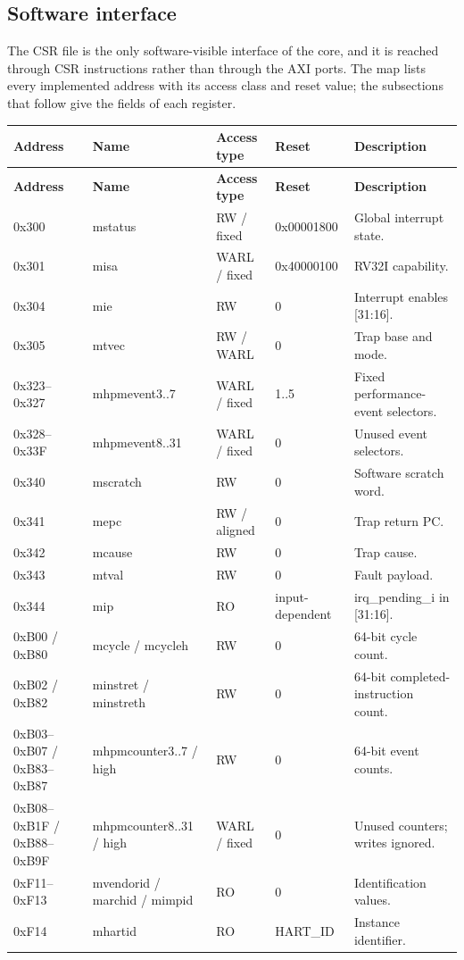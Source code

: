 \documentclass[11pt]{article}
\begin{document}
\subsection{Software interface}
\noindent The CSR file is the only software-visible interface of the core, and it is reached through CSR instructions rather than through the AXI ports. The map lists every implemented address with its access class and reset value; the subsections that follow give the fields of each register.\par\medskip
{\small
\begin{longtable}{@{}L{0.1900\dimexpr\linewidth-48pt\relax}L{0.2300\dimexpr\linewidth-48pt\relax}L{0.1400\dimexpr\linewidth-48pt\relax}L{0.1500\dimexpr\linewidth-48pt\relax}L{0.2900\dimexpr\linewidth-48pt\relax}@{}}
\toprule
\textbf{Address} & \textbf{Name} & \textbf{Access type} & \textbf{Reset} & \textbf{Description} \\ \midrule
\endfirsthead
\toprule
\textbf{Address} & \textbf{Name} & \textbf{Access type} & \textbf{Reset} & \textbf{Description} \\ \midrule
\endhead
0x300 & mstatus & RW / fixed & 0x00001800 & Global interrupt state. \\ \addlinespace[3pt]
0x301 & misa & WARL / fixed & 0x40000100 & RV32I capability. \\ \addlinespace[3pt]
0x304 & mie & RW & 0 & Interrupt enables [31:16]. \\ \addlinespace[3pt]
0x305 & mtvec & RW / WARL & 0 & Trap base and mode. \\ \addlinespace[3pt]
0x323–0x327 & mhpmevent3..7 & WARL / fixed & 1..5 & Fixed performance-event selectors. \\ \addlinespace[3pt]
0x328–0x33F & mhpmevent8..31 & WARL / fixed & 0 & Unused event selectors. \\ \addlinespace[3pt]
0x340 & mscratch & RW & 0 & Software scratch word. \\ \addlinespace[3pt]
0x341 & mepc & RW / aligned & 0 & Trap return PC. \\ \addlinespace[3pt]
0x342 & mcause & RW & 0 & Trap cause. \\ \addlinespace[3pt]
0x343 & mtval & RW & 0 & Fault payload. \\ \addlinespace[3pt]
0x344 & mip & RO & input-dependent & irq\_pending\_i in [31:16]. \\ \addlinespace[3pt]
0xB00 / 0xB80 & mcycle / mcycleh & RW & 0 & 64-bit cycle count. \\ \addlinespace[3pt]
0xB02 / 0xB82 & minstret / minstreth & RW & 0 & 64-bit completed-instruction count. \\ \addlinespace[3pt]
0xB03–0xB07 / 0xB83–0xB87 & mhpmcounter3..7 / high & RW & 0 & 64-bit event counts. \\ \addlinespace[3pt]
0xB08–0xB1F / 0xB88–0xB9F & mhpmcounter8..31 / high & WARL / fixed & 0 & Unused counters; writes ignored. \\ \addlinespace[3pt]
0xF11–0xF13 & mvendorid / marchid / mimpid & RO & 0 & Identification values. \\ \addlinespace[3pt]
0xF14 & mhartid & RO & HART\_ID & Instance identifier. \\*
\bottomrule\end{longtable}}
\end{document}
